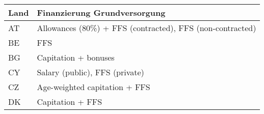 \documentclass[ngerman,a4paper]{article}
\begin{document}
\begin{longtable}[c]{@{}ll@{}}
\toprule
\begin{minipage}[b]{0.08\columnwidth}\raggedright\strut
Land
\strut\end{minipage} &
\begin{minipage}[b]{0.86\columnwidth}\raggedright\strut
Finanzierung Grundversorgung
\strut\end{minipage}\tabularnewline
\midrule
\endhead
\begin{minipage}[t]{0.08\columnwidth}\raggedright\strut
AT
\strut\end{minipage} &
\begin{minipage}[t]{0.86\columnwidth}\raggedright\strut
Allowances (80\%) + FFS (contracted), FFS (non-contracted)
\strut\end{minipage}\tabularnewline
\begin{minipage}[t]{0.08\columnwidth}\raggedright\strut
BE
\strut\end{minipage} &
\begin{minipage}[t]{0.86\columnwidth}\raggedright\strut
FFS
\strut\end{minipage}\tabularnewline
\begin{minipage}[t]{0.08\columnwidth}\raggedright\strut
BG
\strut\end{minipage} &
\begin{minipage}[t]{0.86\columnwidth}\raggedright\strut
Capitation + bonuses
\strut\end{minipage}\tabularnewline
\begin{minipage}[t]{0.08\columnwidth}\raggedright\strut
CY
\strut\end{minipage} &
\begin{minipage}[t]{0.86\columnwidth}\raggedright\strut
Salary (public), FFS (private)
\strut\end{minipage}\tabularnewline
\begin{minipage}[t]{0.08\columnwidth}\raggedright\strut
CZ
\strut\end{minipage} &
\begin{minipage}[t]{0.86\columnwidth}\raggedright\strut
Age-weighted capitation + FFS
\strut\end{minipage}\tabularnewline
\begin{minipage}[t]{0.08\columnwidth}\raggedright\strut
DK
\strut\end{minipage} &
\begin{minipage}[t]{0.86\columnwidth}\raggedright\strut
Capitation + FFS
\strut\end{minipage}\tabularnewline

\end{longtable}
\end{document}

